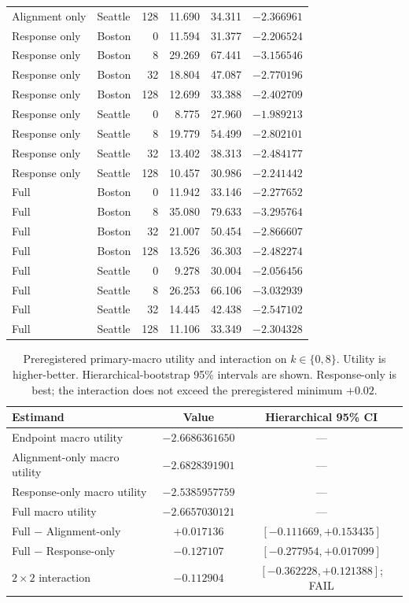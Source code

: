 \documentclass{article}
\begin{document}
\begin{table}[h]
\begin{tabular}{llrrrr}
Alignment only & Seattle & 128 & 11.690 & 34.311 & $-2.366961$ \\
Response only & Boston & 0 & 11.594 & 31.377 & $-2.206524$ \\
Response only & Boston & 8 & 29.269 & 67.441 & $-3.156546$ \\
Response only & Boston & 32 & 18.804 & 47.087 & $-2.770196$ \\
Response only & Boston & 128 & 12.699 & 33.388 & $-2.402709$ \\
Response only & Seattle & 0 & 8.775 & 27.960 & $-1.989213$ \\
Response only & Seattle & 8 & 19.779 & 54.499 & $-2.802101$ \\
Response only & Seattle & 32 & 13.402 & 38.313 & $-2.484177$ \\
Response only & Seattle & 128 & 10.457 & 30.986 & $-2.241442$ \\
Full & Boston & 0 & 11.942 & 33.146 & $-2.277652$ \\
Full & Boston & 8 & 35.080 & 79.633 & $-3.295764$ \\
Full & Boston & 32 & 21.007 & 50.454 & $-2.866607$ \\
Full & Boston & 128 & 13.526 & 36.303 & $-2.482274$ \\
Full & Seattle & 0 & 9.278 & 30.004 & $-2.056456$ \\
Full & Seattle & 8 & 26.253 & 66.106 & $-3.032939$ \\
Full & Seattle & 32 & 14.445 & 42.438 & $-2.547102$ \\
Full & Seattle & 128 & 11.106 & 33.349 & $-2.304328$ \\
\bottomrule
\end{tabular}
\end{table}

\begin{table}[h]
\caption{Preregistered primary-macro utility and interaction on
$k\in\{0,8\}$.  Utility is higher-better.  Hierarchical-bootstrap 95\%
intervals are shown.  Response-only is best; the interaction does not
exceed the preregistered minimum $+0.02$.}
\label{tab:factorial-stats}
\centering
\small
\begin{tabular}{lcc}
\toprule
Estimand & Value & Hierarchical 95\% CI \\
\midrule
Endpoint macro utility & $-2.6686361650$ & --- \\
Alignment-only macro utility & $-2.6828391901$ & --- \\
Response-only macro utility & $-2.5385957759$ & --- \\
Full macro utility & $-2.6657030121$ & --- \\
Full $-$ Alignment-only & $+0.017136$ & $[-0.111669,+0.153435]$ \\
Full $-$ Response-only & $-0.127107$ & $[-0.277954,+0.017099]$ \\
$2\times2$ interaction & $-0.112904$ & $[-0.362228,+0.121388]$; FAIL \\
\bottomrule
\end{tabular}
\end{table}
\end{document}
